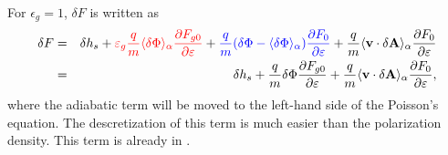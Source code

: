 \documentclass{article}
\newcommand{\tmcolor}[2]{{\color{#1}{#2}}}
\newcommand{\tmtexttt}[1]{\text{{\ttfamily{#1}}}}
\begin{document}
For $\epsilon_g = 1$, $\delta F$ is written as
\begin{eqnarray}
  \delta F & = & \delta h_s + \tmcolor{red}{\varepsilon_g \frac{q}{m} \langle
  \delta \Phi \rangle_{\alpha} \frac{\partial F_{g 0}}{\partial \varepsilon}}
  + \tmcolor{blue}{\frac{q}{m} (\delta \Phi - \langle \delta \Phi
  \rangle_{\alpha}) \frac{\partial F_0}{\partial \varepsilon}} + \frac{q}{m}
  \langle \mathbf{v} \cdot \delta \mathbf{A} \rangle_{\alpha} \frac{\partial
  F_0}{\partial \varepsilon} \nonumber\\
  & = & \delta h_s + \frac{q}{m} \delta \Phi \frac{\partial F_{g 0}}{\partial
  \varepsilon} + \frac{q}{m} \langle \mathbf{v} \cdot \delta \mathbf{A}
  \rangle_{\alpha} \frac{\partial F_0}{\partial \varepsilon}, 
\end{eqnarray}
where the adiabatic term will be moved to the left-hand side of the Poisson's
equation. The descretization of this term is much easier than the polarization
density. This term is already in \tmtexttt{GEM}.
\end{document}
